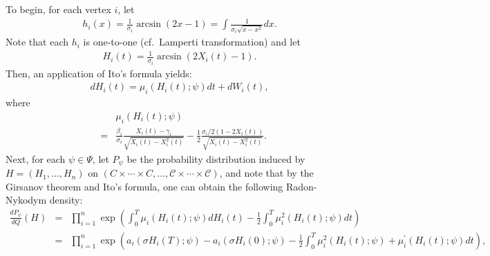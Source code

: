 \documentclass[12pt]{article}%
\begin{document}
To begin, for each vertex $i$, let
\begin{eqnarray}
h_i(x) = \frac{1}{\sigma_i}\arcsin(2x-1) = \int \frac{1}{\sigma_i\sqrt{x-x^2}}dx.
\end{eqnarray}
Note that each $h_i$ is one-to-one (cf.\ Lamperti transformation) and let
\begin{eqnarray}
H_i(t) = \frac{1}{\sigma_i}\arcsin(2X_i(t)-1).
\end{eqnarray}
Then, an application of Ito's formula yields:
\begin{eqnarray}
dH_i(t) = \mu_i(H_i(t);\psi) dt + dW_i(t),
\end{eqnarray}
where
\begin{eqnarray*}
&\ & \mu_i(H_i(t);\psi) \\
&=& \frac{\beta_i}{\sigma_i} \frac{X_i(t)-\gamma_i}{\sqrt{X_i(t)-X_i^2(t)}}
-  \frac{1}{2} \frac{\sigma_i/2 (1-2X_i(t))}{\sqrt{X_i(t) - X_i^2(t)}}.%
\end{eqnarray*}
Next, for each $\psi \in \Psi$, let $P_\psi$ be the probability distribution induced by $H = (H_1,\ldots, H_n)$ on $(C\times\cdots\times C,\ldots, \mathcal C\times\cdots\times \mathcal C)$, and note that by the Girsanov theorem and Ito's formula,  
one can obtain the following Radon-Nykodym density:
\begin{eqnarray*}
\frac{dP_{\psi}}{dQ}(H)
&= &
\prod_{i=1}^n \exp\left(
\int_0^T \mu_i(H_i(t);\psi)dH_i(t)
-
\frac{1}{2} \int_0^T \mu_i^2(H_i(t);\psi)dt\right)\\
&= &
\prod_{i=1}^n \exp\left(
a_i(\sigma H_i(T);\psi) - a_i(\sigma H_i(0);\psi)
-\frac{1}{2} \int_0^T \mu_i^2(H_i(t);\psi) + \mu_i^\prime(H_i(t);\psi) dt\right),
\end{eqnarray*}
\end{document}
